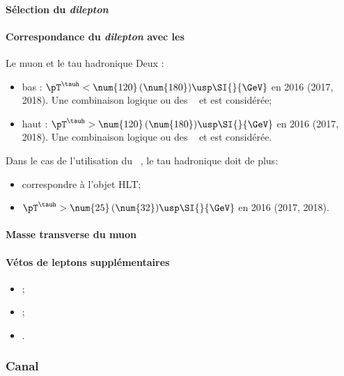 \paragraph{Sélection du \emph{dilepton}}
\AtLeastOneOSPair{\mu\tauh}
\IfMoreOnePair
\paragraph{Correspondance du \emph{dilepton} avec les \HLTpaths}
Le muon et le tau hadronique \FromPairMatchToHLTObjects{}
Deux \HLTregionsDefined:
\begin{itemize}
    \item bas \pT: $\pT^{\tauh} < \num{120} \, (\num{180}) \usp \SI{}{\GeV}$ en 2016 (2017, 2018).
        Une combinaison logique \og ou \fg{} des \HLTpaths\ \HLTSingleMu{} et \HLTMuTauCross{} est considérée;
    \item haut \pT: $\pT^{\tauh} > \num{120} \, (\num{180}) \usp \SI{}{\GeV}$ en 2016 (2017, 2018).
        Une combinaison logique \og ou \fg{} des \HLTpaths\ \HLTSingleMu{} et \HLTSingleTau{} est considérée.
\end{itemize}
Dans le cas de l'utilisation du \HLTpath\ \HLTMuTauCross{}, le tau hadronique doit de plus:
\begin{itemize}
    \item correspondre à l'objet HLT;
    \item $\pT^{\tauh} > \num{25} \, (\num{32}) \usp \SI{}{\GeV}$ en 2016 (2017, 2018).
\end{itemize}
\paragraph{Masse transverse du muon}
\paragraph{Vétos de leptons supplémentaires}
\LeptonVetoes
\begin{itemize}
    \item \LeptonVetoesSecondMuon;
    \item \LeptonVetoesExtraEle;
    \item \LeptonVetoesMuonPair.
\end{itemize}

\subsubsection{Canal \ele\tauh}\label{chapter-HTT_analysis-section-offline-et}
